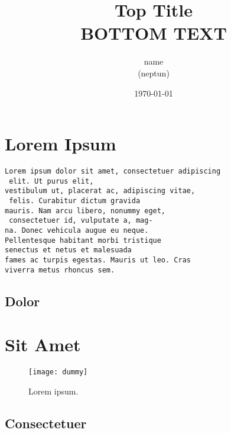 

\title{Top Title \\ \small{BOTTOM TEXT}}
\author{name \\ \small{(neptun)}}
\date{\today}





\myTitlePage

\section{Lorem Ipsum}
\lipsum[1-2]

\begin{lstlisting}[frame=single, caption={Lorem Ipsum Listing}, captionpos=b]
Lorem ipsum dolor sit amet, consectetuer adipiscing
 elit. Ut purus elit,
vestibulum ut, placerat ac, adipiscing vitae,
 felis. Curabitur dictum gravida
mauris. Nam arcu libero, nonummy eget,
 consectetuer id, vulputate a, mag-
na. Donec vehicula augue eu neque. 
Pellentesque habitant morbi tristique
senectus et netus et malesuada 
fames ac turpis egestas. Mauris ut leo. Cras
viverra metus rhoncus sem.
\end{lstlisting}

\subsection{Dolor}
\lipsum[2-3]
\section{Sit Amet}
\lipsum[1-2]

\begin{figure}[htb]
	\texttt{[image: dummy]}
	\centering
	\caption{Lorem ipsum.}
	\label{fig:dummy}
\end{figure}

\subsection{Consectetuer}
\lipsum[2-3]

\myTOC

